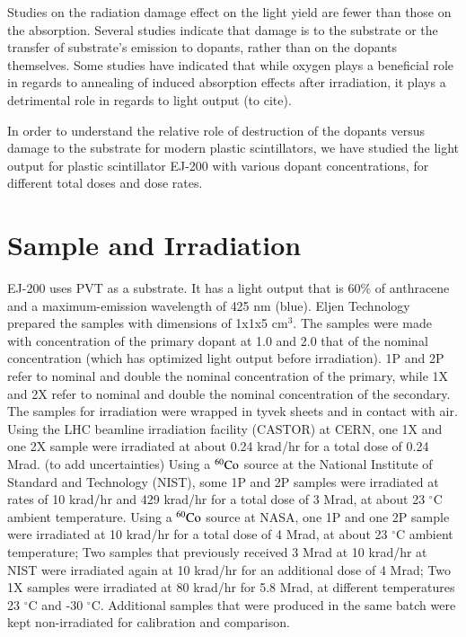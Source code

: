 \documentclass[preprint,12pt]{elsarticle}
\begin{document}
Studies on the radiation damage effect on the light yield are fewer than those on the absorption. 
Several studies indicate that damage is to the substrate or the transfer of substrate's emission to dopants, 
rather than on the dopants themselves.
Some studies have indicated that while oxygen plays a beneficial role in regards to annealing of induced absorption effects after 
irradiation, it plays a detrimental role in regards to light output (to cite). 

In order to understand the relative role of destruction of the dopants versus damage to the substrate for modern plastic scintillators, 
we have studied the light output for plastic scintillator EJ-200 with various dopant concentrations, 
for different total doses and dose rates. 

\section{Sample and Irradiation}
EJ-200 uses PVT as a substrate. It has a light output that is 60\% of anthracene and a maximum-emission wavelength of 425 nm (blue). 
Eljen Technology prepared the samples with dimensions of 1x1x5 cm$^{3}$. 
The samples were made with concentration of the primary dopant at 1.0 and 2.0 that of 
the nominal concentration (which has optimized light output before irradiation). 
1P and 2P refer to nominal and double the nominal concentration of the primary, 
while 1X and 2X refer to nominal and double the nominal concentration of the secondary.
The samples for irradiation were wrapped in tyvek sheets and in contact with air.
Using the LHC beamline irradiation facility (CASTOR) at CERN, 
one 1X and one 2X sample were irradiated at about 0.24 krad/hr for a total dose of 0.24 Mrad. (to add uncertainties) 
Using a $\rm {^{60}Co}$ source at the National Institute of Standard and Technology (NIST), some 1P and 2P samples were irradiated  
at rates of 10 krad/hr and 429 krad/hr for a total dose of 3 Mrad, at about 23 $^\circ$C ambient temperature.  
Using a $\rm {^{60}Co}$ source at NASA, one 1P and one 2P sample were irradiated  
at 10 krad/hr for a total dose of 4 Mrad, at about 23 $^\circ$C ambient temperature; 
Two samples that previously received 3 Mrad at 10 krad/hr at NIST were irradiated again at 10 krad/hr for an additional dose of 4 Mrad;
Two 1X samples were irradiated at 80 krad/hr for 5.8 Mrad, at different temperatures 23 $^\circ$C and -30 $^\circ$C.
Additional samples that were produced in the same batch were kept non-irradiated for calibration and comparison.
\end{document}
